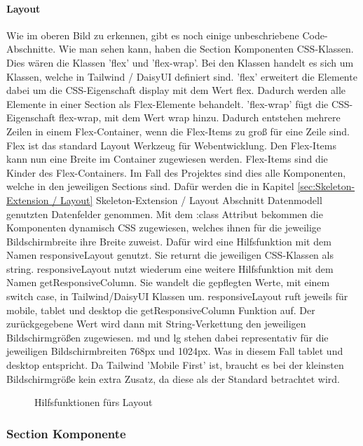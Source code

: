 \paragraph{Layout}

Wie im oberen Bild zu erkennen, gibt es noch einige unbeschriebene Code-Abschnitte. Wie man sehen kann, haben die Section Komponenten CSS-Klassen. Dies wären die Klassen 'flex' und 'flex-wrap'. Bei den Klassen handelt es sich um Klassen, welche in Tailwind / DaisyUI definiert sind. 'flex' erweitert die Elemente dabei um die CSS-Eigenschaft display mit dem Wert flex. Dadurch werden alle Elemente in einer Section als Flex-Elemente behandelt. 'flex-wrap' fügt die CSS-Eigenschaft flex-wrap, mit dem Wert wrap hinzu. Dadurch entstehen mehrere Zeilen in einem Flex-Container, wenn die Flex-Items zu groß für eine Zeile sind. Flex ist das standard Layout Werkzeug für Webentwicklung. Den Flex-Items kann nun eine Breite im Container zugewiesen werden. Flex-Items sind die Kinder des Flex-Containers. Im Fall des Projektes sind dies alle Komponenten, welche in den jeweiligen Sections sind. Dafür werden die in Kapitel \ref{sec:Skeleton-Extension / Layout} Skeleton-Extension / Layout Abschnitt Datenmodell genutzten Datenfelder genommen. Mit dem :class Attribut bekommen die Komponenten dynamisch CSS zugewiesen, welches ihnen für die jeweilige Bildschirmbreite ihre Breite zuweist. Dafür wird eine Hilfsfunktion mit dem Namen responsiveLayout genutzt. Sie returnt die jeweiligen CSS-Klassen als string. responsiveLayout nutzt wiederum eine weitere Hilfsfunktion mit dem Namen getResponsiveColumn. Sie wandelt die gepflegten Werte, mit einem switch case, in Tailwind/DaisyUI Klassen um. responsiveLayout ruft jeweils für mobile, tablet und desktop die getResponsiveColumn Funktion auf. Der zurückgegebene Wert wird dann mit String-Verkettung den jeweiligen Bildschirmgrößen zugewiesen. md und lg stehen dabei representativ für die jeweiligen Bildschirmbreiten 768px und 1024px. Was in diesem Fall tablet und desktop entspricht. Da Tailwind 'Mobile First' ist, braucht es bei der kleinsten Bildschirmgröße kein extra Zusatz, da diese als der Standard betrachtet wird.

\begin{figure}[htb]
\centering
{}
\caption{Hilfsfunktionen fürs Layout}
\end{figure}

\subsubsection{Section Komponente}
\label{sec:Section Komponente}

